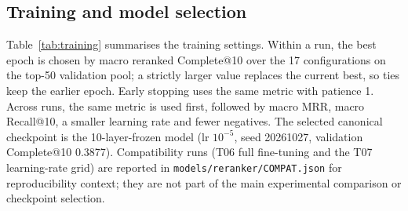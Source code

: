 \documentclass[conference]{IEEEtran}
\begin{document}
\subsection{Training and model selection}
Table~\ref{tab:training} summarises the training settings. Within a run, the best epoch is chosen by macro reranked Complete@10 over the 17 configurations on the top-50 validation pool; a strictly larger value replaces the current best, so ties keep the earlier epoch. Early stopping uses the same metric with patience 1. Across runs, the same metric is used first, followed by macro MRR, macro Recall@10, a smaller learning rate and fewer negatives. The selected canonical checkpoint is the 10-layer-frozen model (lr $10^{-5}$, seed 20261027, validation Complete@10 0.3877). Compatibility runs (T06 full fine-tuning and the T07 learning-rate grid) are reported in \texttt{models/reranker/COMPAT.json} for reproducibility context; they are not part of the main experimental comparison or checkpoint selection.

\begin{table}[t]
\centering
\caption{Training settings. T06 and T07 are compatibility experiments, not the paper's checkpoint.}
\label{tab:training}
\small
{}
\end{table}
\end{document}

